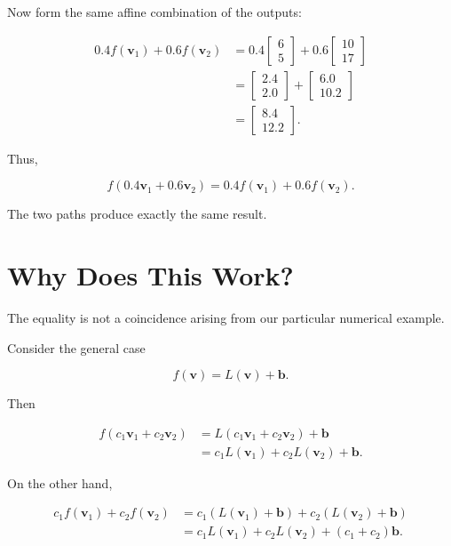 \documentclass[12pt]{article}
\newcommand{\Vector}[1]{\mathbf{#1}}
\begin{document}
Now form the same affine combination of the outputs:

\begin{align*}
0.4f(\Vector{v}_1)+0.6f(\Vector{v}_2)
&=
0.4
\begin{bmatrix}
6\\
5
\end{bmatrix}
+
0.6
\begin{bmatrix}
10\\
17
\end{bmatrix}
\\[6pt]
&=
\begin{bmatrix}
2.4\\
2.0
\end{bmatrix}
+
\begin{bmatrix}
6.0\\
10.2
\end{bmatrix}
\\[6pt]
&=
\boxed{
\begin{bmatrix}
8.4\\
12.2
\end{bmatrix}
}.
\end{align*}

Thus,

\[
\boxed{
f(0.4\Vector{v}_1+0.6\Vector{v}_2)
=
0.4f(\Vector{v}_1)+0.6f(\Vector{v}_2)
}.
\]

The two paths produce exactly the same result.

\section{Why Does This Work?}
The equality is not a coincidence arising from our particular
numerical example.

Consider the general case

\[
    f(\Vector{v})=L(\Vector{v})+\Vector{b}.
\]

Then

\begin{align*}
f(c_1\Vector{v}_1+c_2\Vector{v}_2)
&=
L(c_1\Vector{v}_1+c_2\Vector{v}_2)+\Vector{b}
\\
&=
c_1L(\Vector{v}_1)
+
c_2L(\Vector{v}_2)
+
\Vector{b}.
\end{align*}

On the other hand,

\begin{align*}
c_1f(\Vector{v}_1)+c_2f(\Vector{v}_2)
&=
c_1
\left(
L(\Vector{v}_1)+\Vector{b}
\right)
+
c_2
\left(
L(\Vector{v}_2)+\Vector{b}
\right)
\\
&=
c_1L(\Vector{v}_1)
+
c_2L(\Vector{v}_2)
+
(c_1+c_2)\Vector{b}.
\end{align*}
\end{document}
